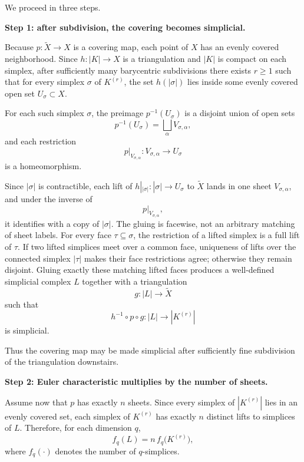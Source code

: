 \begin{solution}
We proceed in three steps.

\par

\textbf{Step 1: after subdivision, the covering becomes simplicial.}

Because \(p:\widetilde X\to X\) is a covering map, each point of \(X\) has an evenly covered neighborhood. Since \(h:|K|\to X\) is a triangulation and \(|K|\) is compact on each simplex, after sufficiently many barycentric subdivisions there exists \(r\ge 1\) such that for every simplex \(\sigma\) of \(K^{(r)}\), the set \(h(|\sigma|)\) lies inside some evenly covered open set \(U_\sigma\subset X\).

For each such simplex \(\sigma\), the preimage \(p^{-1}(U_\sigma)\) is a disjoint union of open sets
\[
p^{-1}(U_\sigma)=\bigsqcup_\alpha V_{\sigma,\alpha},
\]
and each restriction
\[
p|_{V_{\sigma,\alpha}}:V_{\sigma,\alpha}\to U_\sigma
\]
is a homeomorphism.

Since \(|\sigma|\) is contractible, each lift of \(h|_{|\sigma|}:|\sigma|\to U_\sigma\) to \(\widetilde X\) lands in one sheet \(V_{\sigma,\alpha}\), and under the inverse of
\[
p|_{V_{\sigma,\alpha}},
\]
it identifies with a copy of \(|\sigma|\). The gluing is facewise, not an arbitrary matching of sheet labels. For every face \(\tau\subseteq\sigma\), the restriction of a lifted simplex is a full lift of \(\tau\). If two lifted simplices meet over a common face, uniqueness of lifts over the connected simplex \(|\tau|\) makes their face restrictions agree; otherwise they remain disjoint. Gluing exactly these matching lifted faces produces a well-defined simplicial complex \(L\) together with a triangulation
\[
g:|L|\to \widetilde X
\]
such that
\[
h^{-1}\circ p\circ g:|L|\to |K^{(r)}|
\]
is simplicial.

Thus the covering map may be made simplicial after sufficiently fine subdivision of the triangulation downstairs.

\par

\textbf{Step 2: Euler characteristic multiplies by the number of sheets.}

Assume now that \(p\) has exactly \(n\) sheets. Since every simplex of \(|K^{(r)}|\) lies in an evenly covered set, each simplex of \(K^{(r)}\) has exactly \(n\) distinct lifts to simplices of \(L\). Therefore, for each dimension \(q\),
\[
f_q(L)=n\,f_q\bigl(K^{(r)}\bigr),
\]
where \(f_q(\cdot)\) denotes the number of \(q\)-simplices.


\end{solution}
